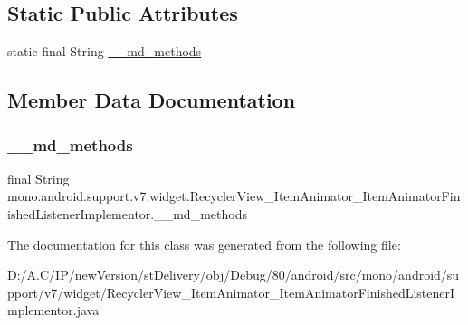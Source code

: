 \subsection*{Static Public Attributes}
\begin{DoxyCompactItemize}
\item 
static final String \hyperlink{classmono_1_1android_1_1support_1_1v7_1_1widget_1_1_recycler_view___item_animator___item_animator_finished_listener_implementor_ab61d1754d9a39a88b3accee404008012}{\+\_\+\+\_\+md\+\_\+methods}
\end{DoxyCompactItemize}


\subsection{Member Data Documentation}
\mbox{\label{classmono_1_1android_1_1support_1_1v7_1_1widget_1_1_recycler_view___item_animator___item_animator_finished_listener_implementor_ab61d1754d9a39a88b3accee404008012}} 
\subsubsection{\texorpdfstring{\+\_\+\+\_\+md\+\_\+methods}{\_\_md\_methods}}
{\footnotesize\ttfamily final String mono.\+android.\+support.\+v7.\+widget.\+Recycler\+View\+\_\+\+Item\+Animator\+\_\+\+Item\+Animator\+Finished\+Listener\+Implementor.\+\_\+\+\_\+md\+\_\+methods\hspace{0.3cm}{\ttfamily [static]}}



The documentation for this class was generated from the following file\+:\begin{DoxyCompactItemize}
\item 
D\+:/\+A.\+C/\+I\+P/new\+Version/st\+Delivery/obj/\+Debug/80/android/src/mono/android/support/v7/widget/Recycler\+View\+\_\+\+Item\+Animator\+\_\+\+Item\+Animator\+Finished\+Listener\+Implementor.\+java\end{DoxyCompactItemize}
